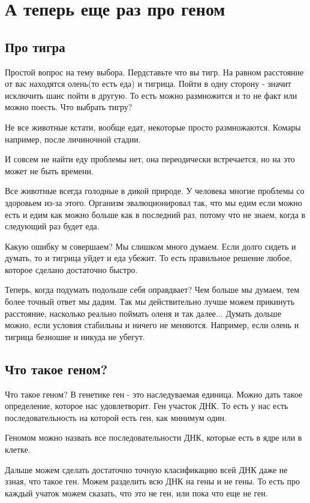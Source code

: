﻿\section{А теперь еще раз про геном}
\subsection{Про тигра}
Простой вопрос на тему выбора. 
Пердставьте что вы тигр. На равном расстояние от 
вас находятся олень(то есть еда) и тигрица. Пойти в одну 
сторону - значит исключить шанс пойти в другую. То есть 
можно размножится и то не факт или можно поесть. Что 
выбрать тигру? 

Не все животные кстати, вообще едат, некоторые просто размножаются. 
Комары например, после личиночной стадии. 

И совсем не найти еду проблемы нет, она переодически встречается, 
но на это может не быть времени. 

Все животные всегда голодные в дикой природе. У человека многие 
проблемы со здоровьем из-за этого. Организм эвалюционировал так, 
что мы едим если можно есть и едим как можно больше как в 
последний раз, потому что не знаем, когда в следующий раз будет еда. 

Какую ошибку м совершаем? Мы слишком много думаем. Если долго 
сидеть и думать, то и тигрица уйдет и еда убежит. То есть 
правильное решение любое, которое сделано достаточно быстро. 

Теперь, когда подумать подольше себя оправдвает? 
Чем больше мы думаем, тем более точный ответ мы дадим. 
Так мы действительно лучше можем прикинуть расстояние, 
насколько реально поймать оленя и так далее... Думать 
дольше можно, если условия стабильны и ничего не меняются. 
Например, если олень и тигрица безношие и никуда не убегут. 

\subsection{Что такое геном?}
Что такое геном? 
В генетике ген - это наследуваемая единица. Можно 
дать такое определение, которое нас удовлетворит. Ген 
участок ДНК. То есть у нас есть последовательность 
на которой есть ген, как минимум один. 

Геномом можно назвать все последовательности ДНК, которые есть 
в ядре или в клетке. 

Дальше можем сделать достаточно точную класификацию 
всей ДНК даже не ззная, что такое ген. Можем разделить 
всю ДНК на гены и не гены. То есть про каждый учаток можем сказать, 
что это не ген, или пока что еще не ген. 

